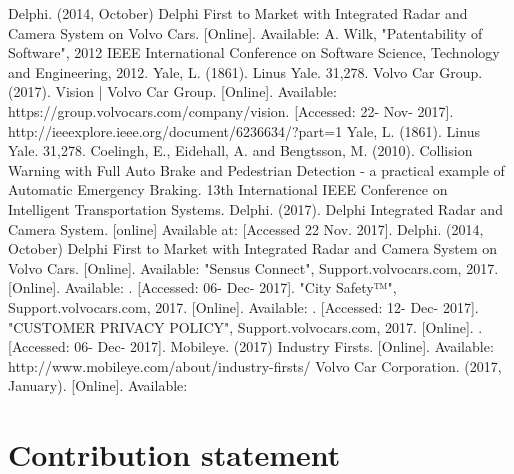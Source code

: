 \documentclass[conference]{IEEEtran}
\begin{document}
\begin{thebibliography}{00}
	 Delphi. (2014, October) Delphi First to Market with Integrated Radar and Camera System on Volvo Cars. [Online]. Available: 
	 A. Wilk, "Patentability of Software", 2012 IEEE International Conference on Software Science, Technology and Engineering, 2012.
	 Yale, L. (1861). Linus Yale. 31,278.
	 Volvo Car Group. (2017). Vision | Volvo Car Group. [Online]. Available: https://group.volvocars.com/company/vision. 		[Accessed: 22- Nov- 2017].
	 http://ieeexplore.ieee.org/document/6236634/?part=1
	 Yale, L. (1861). Linus Yale. 31,278.
	 Coelingh, E., Eidehall, A. and Bengtsson, M. (2010). Collision Warning with Full Auto Brake and Pedestrian Detection - a practical example of Automatic Emergency Braking. 13th International IEEE Conference on Intelligent Transportation Systems.
	 Delphi. (2017). Delphi Integrated Radar and Camera System. [online] Available at:  [Accessed 22 Nov. 2017].
	 Delphi. (2014, October) Delphi First to Market with Integrated Radar and Camera System on Volvo Cars. [Online]. Available: 
	 "Sensus Connect", Support.volvocars.com, 2017. [Online]. Available: . [Accessed: 06- Dec- 2017].
	 "City Safety™", Support.volvocars.com, 2017. [Online]. Available: . [Accessed: 12- Dec- 2017]. 
	 "CUSTOMER PRIVACY POLICY", Support.volvocars.com, 2017. [Online]. . [Accessed: 06- Dec- 2017].
	  Mobileye. (2017) Industry Firsts. [Online]. Available: http://www.mobileye.com/about/industry-firsts/
	 Volvo Car Corporation. (2017, January). [Online]. Available: 
	
\end{thebibliography}

\pagebreak
\appendix
\section*{Contribution statement}
\end{document}
